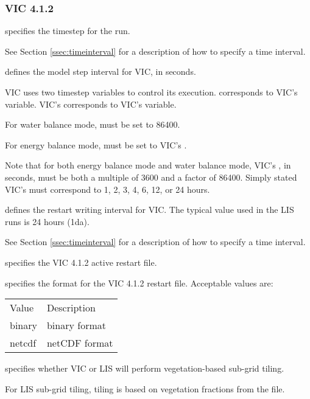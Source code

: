  
 \subsubsection{VIC 4.1.2} \label{sssec:lsm_vic412}
 

 
  specifies the timestep for the run.

 See Section \ref{ssec:timeinterval} for a description
 of how to specify a time interval.

  defines the model step
 interval for VIC, in seconds.

 VIC uses two timestep variables to control its execution.
  corresponds to VIC's
  variable.  VIC's 
 corresponds to VIC's  variable.

 For water balance mode, 
 must be set to 86400.

 For energy balance mode, 
 must be set to VIC's .

 Note that for both energy balance mode and water balance mode,
 VIC's , in seconds, must be both a
 multiple of 3600 and a factor of 86400.
 Simply stated VIC's  must
 correspond to 1, 2, 3, 4, 6, 12, or 24 hours.

  defines the restart
 writing interval for VIC. The typical value used in the
 LIS runs is 24 hours (1da).

 See Section \ref{ssec:timeinterval} for a description
 of how to specify a time interval.

  specifies the VIC 4.1.2 active
 restart file.

  specifies the format for the
 VIC 4.1.2 restart file.
 Acceptable values are:
 \begin{tabular}{ll}
 Value  & Description   \\
 binary & binary format \\
 netcdf & netCDF format \\
 \end{tabular}

  specifies whether VIC or LIS
 will perform vegetation-based sub-grid tiling.

 For LIS sub-grid tiling, tiling is based on vegetation fractions
 from the  file.

